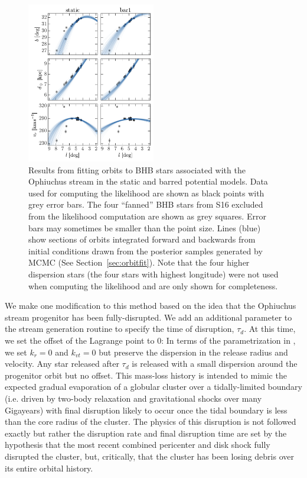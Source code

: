 \documentclass[numberedappendix]{emulateapj}
\begin{document}
\begin{figure}[!tbp]
\begin{center}
\includegraphics[width=0.5\textwidth]{figures/orbitfits}
\caption{ Results from fitting orbits to BHB stars associated with the Ophiuchus stream in the static and barred potential models. Data used for computing the likelihood are shown as black points with grey error bars. The four ``fanned'' BHB stars from S16 excluded from the likelihood computation are shown as grey squares. Error bars may sometimes be smaller than the point size. Lines (blue) show sections of orbits integrated forward and backwards from initial conditions drawn from the posterior samples generated by MCMC (See Section~\ref{sec:orbitfit}). Note that the four higher dispersion stars (the four stars with highest longitude) were not used when computing the likelihood and are only shown for completeness. }
\label{fig:orbitfits}
\end{center}
\end{figure}

We make one modification to this method based on the idea that the Ophiuchus stream progenitor has been fully-disrupted. We add an additional parameter to the stream generation routine to specify the time of disruption, $\tau_d$. At this time, we set the offset of the Lagrange point to 0: In terms of the parametrization in \citep{fardal14}, we set $k_r = 0$ and $k_{vt}=0$ but preserve the dispersion in the release radius and velocity. Any star released after $\tau_d$ is released with a small dispersion around the progenitor orbit but no offset. This mass-loss history is intended to mimic the expected gradual evaporation of a globular cluster over a tidally-limited boundary (i.e. driven by two-body relaxation and gravitational shocks over many Gigayears) with final disruption likely to occur once the tidal boundary is less than the core radius of the cluster. The physics of this disruption is not followed exactly but rather the disruption rate and final disruption time are set by the hypothesis that the most recent combined pericenter and disk shock fully disrupted the cluster, but, critically, that the cluster has been losing debris over its entire orbital history.
\end{document}
